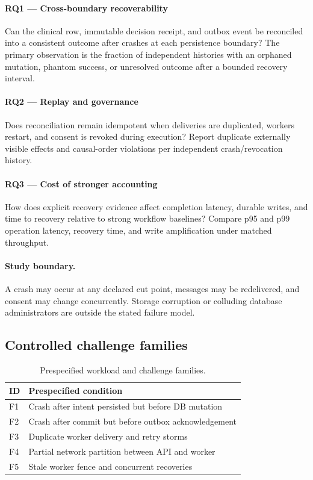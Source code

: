 \documentclass[11pt,a4paper]{article}
\begin{document}
\paragraph{RQ1 — Cross-boundary recoverability} Can the clinical row, immutable decision receipt, and outbox event be reconciled into a consistent outcome after crashes at each persistence boundary? The primary observation is the fraction of independent histories with an orphaned mutation, phantom success, or unresolved outcome after a bounded recovery interval.

\paragraph{RQ2 — Replay and governance} Does reconciliation remain idempotent when deliveries are duplicated, workers restart, and consent is revoked during execution? Report duplicate externally visible effects and causal-order violations per independent crash/revocation history.

\paragraph{RQ3 — Cost of stronger accounting} How does explicit recovery evidence affect completion latency, durable writes, and time to recovery relative to strong workflow baselines? Compare p95 and p99 operation latency, recovery time, and write amplification under matched throughput.

\paragraph{Study boundary.} A crash may occur at any declared cut point, messages may be redelivered, and consent may change concurrently. Storage corruption or colluding database administrators are outside the stated failure model.

\subsection{Controlled challenge families}
\begin{table}[ht]
\centering\small
\caption{Prespecified workload and challenge families.}
\begin{tabularx}{\linewidth}{@{}lX@{}}\toprule
ID & Prespecified condition \\ \midrule
F1 & Crash after intent persisted but before DB mutation \\ 
F2 & Crash after commit but before outbox acknowledgement \\ 
F3 & Duplicate worker delivery and retry storms \\ 
F4 & Partial network partition between API and worker \\ 
F5 & Stale worker fence and concurrent recoveries \\ 
\bottomrule\end{tabularx}\end{table}
\end{document}
